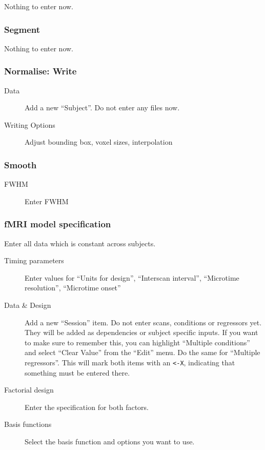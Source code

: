 \documentclass[a4paper]{book}
\begin{document}
Nothing to enter now.

\subsubsection*{Segment}

 Nothing to enter now.

\subsubsection*{Normalise: Write}

\begin{description}
\item[Data] Add a new ``Subject''. Do not enter any files now.
\item[Writing Options] Adjust bounding box, voxel sizes, interpolation
\end{description}

\subsubsection*{Smooth}

\begin{description}
\item[FWHM] Enter FWHM
\end{description}

\subsubsection*{fMRI model specification} 

Enter all data which is constant across subjects. 
\begin{description}
\item[Timing parameters] Enter values for ``Units for design'', ``Interscan
  interval'', ``Microtime resolution'', ``Microtime onset''
\item[Data \& Design] Add a new ``Session'' item. Do not enter scans,
  conditions or regressors yet. They will be added as dependencies or
  subject specific inputs. If you want to make sure to remember this, you
  can highlight ``Multiple conditions'' and select ``Clear Value'' from the
  ``Edit'' menu. Do the same for ``Multiple regressors''. This will mark
  both items with an \verb|<-X|, indicating that something must be entered
  there.
\item[Factorial design] Enter the specification for both factors.
\item[Basis functions] Select the basis function and options you want to use.
\end{description}
\end{document}
